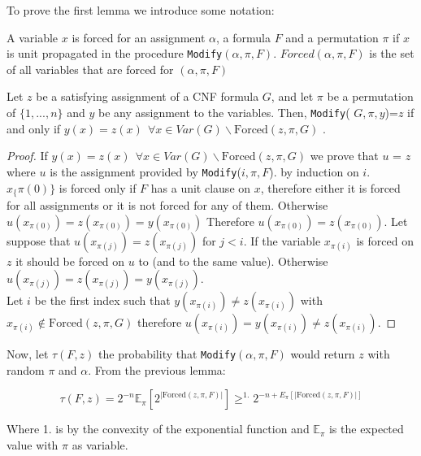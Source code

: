 To prove the first lemma we introduce some notation:

\begin{definition}
  A variable $x$ is forced for an assignment $\alpha$, a formula $F$ and a permutation $\pi$ if $x$ is unit propagated in the procedure \texttt{Modify}$(\alpha, \pi, F)$. $Forced(\alpha, \pi, F)$ is the set of all variables that are forced for $(\alpha, \pi, F)$
\end{definition}

\begin{lemma} Let $z$ be a satisfying assignment of a CNF formula $G$, and let $\pi$ be a permutation of 
$\{1,...,n\}$ and $y$ be any assignment to the variables. Then,
  \texttt{Modify}( $G,\pi,y$)=$z$ if and only if $y(x) = z(x)\ \  \forall x \in Var(G) \backslash \text{Forced}(z, \pi, G)$ .
\end{lemma}

\begin{proof}
  
  If $y(x) = z(x)\ \  \forall x \in Var(G) \backslash \text{Forced}(z, \pi, G)$ we prove that $u$ = $z$ where $u$ is the assignment provided by  \texttt{Modify}($i,\pi,F$). by induction on $i$.  $x_\{\pi(0)\}$ is forced only if $F$ has a unit clause on $x$, therefore either it is forced for all assignments or it is not forced for any of them. Otherwise $u(x_{\pi(0)}) = z(x_{\pi(0)})= y(x_{\pi(0)})$ Therefore $u(x_{\pi(0)}) = z(x_{\pi(0)})$. Let suppose that $u(x_{\pi(j)}) = z(x_{\pi(j)})$ for $j < i$. If the variable $x_{\pi(i)}$ is forced on $z$ it should be forced on $u$ to (and to the same value). Otherwise $u(x_{\pi(j)}) = z(x_{\pi(j)})= y(x_{\pi(j)})$. \\

  Let $i$ be the first index such that $y(x_{\pi(i)})\ne z(x_{\pi(i)})$ with $x_{\pi(i)} \not \in \text{Forced}(z, \pi, G)$ therefore $u(x_{\pi(i)})=y(x_{\pi(i)})\ne z(x_{\pi(i)})$.
\end{proof}

Now, let $\tau (F,z)$ the probability that \texttt{Modify}$(\alpha,\pi,F)$ would return $z$ with random $\pi$ and $\alpha$. From the previous lemma:

$$ \tau(F,z) = 2^{-n} \mathbb{E}_{\pi}[2^{|\text{Forced}(z, \pi, F)|}] \ge^{1.} 2^{-n +E_{\pi}[{|\text{Forced}(z, \pi, F)|}] }$$

Where 1. is by the convexity of the exponential function and $\mathbb{E}_{\pi}$ is the expected value with $\pi$ as variable. \\

